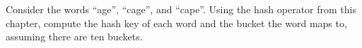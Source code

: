 \begin{ExerciseList}
\Exercise Consider the words ``age'', ``cage'', and ``cape''.
Using the hash operator from this chapter, compute the hash key of each word
and the bucket the word maps to, assuming there are ten buckets.



\end{ExerciseList}
